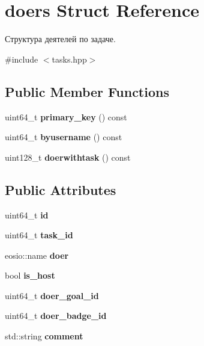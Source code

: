 \hypertarget{structdoers}{}\section{doers Struct Reference}
\label{structdoers}


Структура деятелей по задаче.  




{\ttfamily \#include $<$tasks.\+hpp$>$}

\subsection*{Public Member Functions}
\begin{DoxyCompactItemize}
\item 
\mbox{\label{structdoers_a3e2bed451801cf7ce95fd740aec789bb}} 
uint64\+\_\+t {\bfseries primary\+\_\+key} () const
\item 
\mbox{\label{structdoers_ad22419489100a8a16e7e236f601bb9d6}} 
uint64\+\_\+t {\bfseries byusername} () const
\item 
\mbox{\label{structdoers_afc148c5ba07006792a44fc4166050c9e}} 
uint128\+\_\+t {\bfseries doerwithtask} () const
\end{DoxyCompactItemize}
\subsection*{Public Attributes}
\begin{DoxyCompactItemize}
\item 
\mbox{\label{structdoers_ab8e912e3cf6661c09ff633f665398a72}} 
uint64\+\_\+t {\bfseries id}
\item 
\mbox{\label{structdoers_a6b3c86f2da155dd9d50d006b9350a442}} 
uint64\+\_\+t {\bfseries task\+\_\+id}
\item 
\mbox{\label{structdoers_ac5f40777c970cd689e869935dff9e315}} 
eosio\+::name {\bfseries doer}
\item 
\mbox{\label{structdoers_a8929f96a2f79a78e4a411fe388ac16d2}} 
bool {\bfseries is\+\_\+host}
\item 
\mbox{\label{structdoers_abea11e633506933a23e48197658e32a2}} 
uint64\+\_\+t {\bfseries doer\+\_\+goal\+\_\+id}
\item 
\mbox{\label{structdoers_a6077b10bd669ac91026736023492a115}} 
uint64\+\_\+t {\bfseries doer\+\_\+badge\+\_\+id}
\item 
\mbox{\label{structdoers_aa29368854c3b0633b6f88367eb11d005}} 
std\+::string {\bfseries comment}
\end{DoxyCompactItemize}


